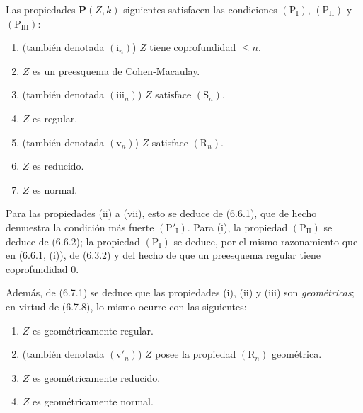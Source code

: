 \begin{examples}[7.3.8]
\label{IV.2.s7.3.8-fr}
Las propiedades $\boldsymbol P(Z,k)$ siguientes
satisfacen las condiciones $(\mathrm P_{\mathrm I})$,
$(\mathrm P_{\mathrm{II}})$ y $(\mathrm P_{\mathrm{III}})$:
\begin{enumerate}
\item[(i)] (también denotada $(\mathrm i_n)$) $Z$ tiene coprofundidad
$\leqslant n$.
\item[(ii)] $Z$ es un preesquema de Cohen-Macaulay.
\item[(iii)] (también denotada $(\mathrm{iii}_n)$) $Z$ satisface
$(\mathrm S_n)$.
\item[(iv)] $Z$ es regular.
\item[(v)] (también denotada $(\mathrm v_n)$) $Z$ satisface
$(\mathrm R_n)$.
\item[(vi)] $Z$ es reducido.
\item[(vii)] $Z$ es normal.
\end{enumerate}
Para las propiedades (ii) a (vii), esto se deduce de (6.6.1), que de
hecho demuestra la condición más fuerte $(\mathrm P'_{\mathrm I})$.
Para (i), la propiedad $(\mathrm P_{\mathrm{II}})$ se deduce de
(6.6.2); la propiedad $(\mathrm P_{\mathrm I})$ se deduce, por el
mismo razonamiento que en (6.6.1, (i)), de (6.3.2) y del hecho de que
un preesquema regular tiene coprofundidad 0.

Además, de (6.7.1) se deduce que las propiedades (i), (ii) y (iii) son
\emph{geométricas}; en virtud de (6.7.8), lo mismo ocurre con las siguientes:
\begin{enumerate}
\item[(iv$'$)] $Z$ es geométricamente regular.
\item[(v$'$)] (también denotada $(\mathrm v'_n)$) $Z$ posee la
propiedad $(\mathrm R_n)$ geométrica.
\item[(vi$'$)] $Z$ es geométricamente reducido.
\item[(vii$'$)] $Z$ es geométricamente normal.
\end{enumerate}
\end{examples}
